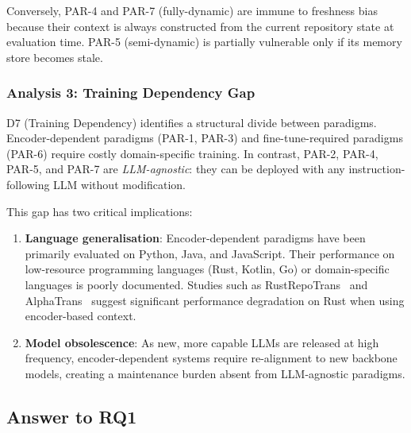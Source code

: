 \documentclass[acmsmall,screen,review]{acmart}
\begin{document}
Conversely, PAR-4 and PAR-7 (fully-dynamic) are immune to freshness
bias because their context is always constructed from the current
repository state at evaluation time. PAR-5 (semi-dynamic) is partially
vulnerable only if its memory store becomes stale.

\subsubsection{Analysis 3: Training Dependency Gap}
\label{subsubsec:tradeoff3}

D7 (Training Dependency) identifies a structural divide between
paradigms. Encoder-dependent paradigms (PAR-1, PAR-3) and
fine-tune-required paradigms (PAR-6) require costly
domain-specific training. In contrast, PAR-2, PAR-4, PAR-5, and
PAR-7 are \emph{LLM-agnostic}: they can be deployed with any
instruction-following LLM without modification.

This gap has two critical implications:
\begin{enumerate}
  \item \textbf{Language generalisation}: Encoder-dependent paradigms
    have been primarily evaluated on Python, Java, and JavaScript. Their
    performance on low-resource programming languages (Rust, Kotlin,
    Go) or domain-specific languages is poorly documented. Studies such
    as RustRepoTrans~\cite{Ou2025RustRepoTrans} and
    AlphaTrans~\cite{Ibrahimzada2025AlphaTrans} suggest significant
    performance degradation on Rust when using encoder-based context.
  \item \textbf{Model obsolescence}: As new, more capable LLMs are
    released at high frequency, encoder-dependent systems require
    re-alignment to new backbone models, creating a maintenance
    burden absent from LLM-agnostic paradigms.
\end{enumerate}

\subsection{Answer to RQ1}
\label{subsec:rq1}
\end{document}
